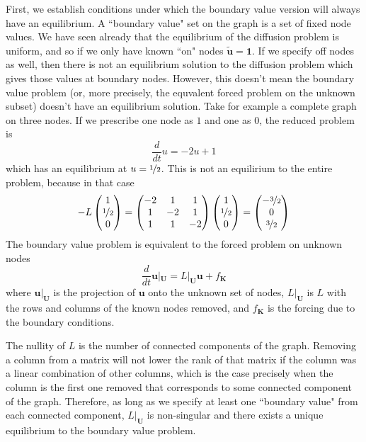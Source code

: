 \documentclass[10pt]{article}
\theoremstyle{definition}
\numberwithin{theorem}{section}
\numberwithin{definition}{section}
\numberwithin{lemma}{section}
\numberwithin{corollary}{section}
\numberwithin{clm}{section}
\numberwithin{rmk}{section}
\newcommand{\nhalf}{\nicefrac{1}{2}}
\renewcommand{\b}{\bm}
\begin{document}
First, we establish conditions under which the boundary value version will always have an equilibrium. A ``boundary value" set on the graph is a set of fixed node values. We have seen already that the equilibrium of the diffusion problem is uniform, and so if we only have known ``on" nodes $\b{\tilde{u}} = \b{1}$.  If we specify off nodes as well, then there is not an equilibrium solution to the diffusion problem which gives those values at boundary nodes. However, this doesn't mean the boundary value problem (or, more precisely, the equvalent forced problem on the unknown subset) doesn't have an equilibrium solution. Take for example a complete graph on three nodes. If we prescribe one node as $1$ and one as $0$, the reduced problem is
\[
\frac{d}{dt} u = -2u + 1
\]
which has an equilibrium at $u = \nhalf$. This is not an equilirium to the entire problem, because in that case
\[
-L\begin{pmatrix}
1 \\ \nhalf \\ 0
\end{pmatrix} = \begin{pmatrix}
-2 & 1 & 1\\ 1 & -2 & 1 \\ 1 & 1 & -2
\end{pmatrix}\begin{pmatrix}
1 \\ \nhalf \\ 0
\end{pmatrix} = \begin{pmatrix}
-\nicefrac{3}{2} \\ 0 \\ \nicefrac{3}{2}
\end{pmatrix}
\]
The boundary value problem is equivalent to the forced problem on unknown nodes
\[
\frac{d}{dt}\b{u}|_{\b{U}} = L|_{\b{U}}\b{u} + f_{\b{K}}
\]
where $\b{u}|_{\b{U}}$ is the projection of $\b{u}$ onto the unknown set of nodes, $L|_{\b{U}}$ is $L$ with the rows and columns of the known nodes removed, and $f_{\b{K}}$ is the forcing due to the boundary conditions.
	
The nullity of $L$ is the number of connected components of the graph. Removing a column from a matrix will not lower the rank of that matrix if the column was a linear combination of other columns, which is the case precisely when the column is the first one removed that corresponds to some connected component of the graph. Therefore, as long as we specify at least one ``boundary value" from each connected component, $L|_{\b{U}}$ is non-singular and there exists a unique equilibrium to the boundary value problem.
\end{document}
